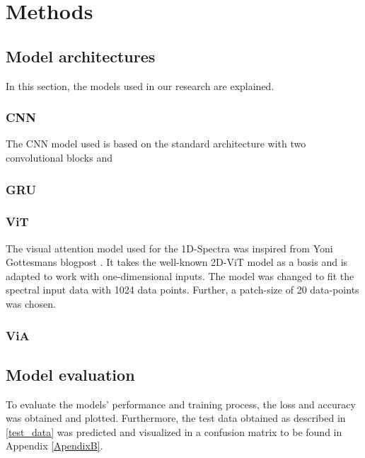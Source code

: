 


\chapter{Methods} %

\label{Chapter3} %







\section{Model architectures}
In this section, the models used in our research are explained.

\subsection{CNN}
The CNN model used is based on the standard architecture with two convolutional blocks and 


\subsection{GRU}


\subsection{ViT}
The visual attention model used for the 1D-Spectra was inspired from Yoni Gottesmans blogpost \cite{noauthor_interpretable_2023}. It takes the well-known 2D-ViT model as a basis and is adapted to work with one-dimensional inputs.
The model was changed to fit the spectral input data with 1024 data points. Further, a patch-size of 20 data-points was chosen.



\subsection{ViA}




\section{Model evaluation}

To evaluate the models' performance and training process, the loss and accuracy was obtained and plotted. Furthermore, the test data obtained as described in \ref{test_data} was predicted and visualized in a confusion matrix to be found in Appendix \ref{ApendixB}.